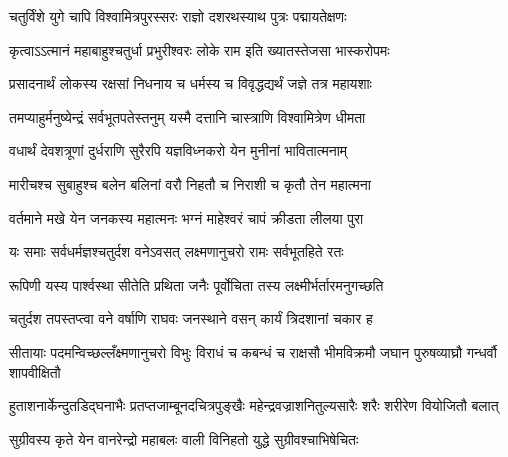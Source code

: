 

\storymeta



\addtocounter{shlokacount}{120}

\twolineshloka
{चतुर्विंशे युगे चापि विश्वामित्रपुरस्सरः}
{राज्ञो दशरथस्याथ पुत्रः पद्मायतेक्षणः}%

\twolineshloka
{कृत्वाऽऽत्मानं महाबाहुश्चतुर्धा प्रभुरीश्वरः}
{लोके राम इति ख्यातस्तेजसा भास्करोपमः}%

\twolineshloka
{प्रसादनार्थं लोकस्य रक्षसां निधनाय च}
{धर्मस्य च विवृद्धद्यर्थं जज्ञे तत्र महायशाः}%

\twolineshloka
{तमप्याहुर्मनुष्येन्द्रं सर्वभूतपतेस्तनुम्}
{यस्मै दत्तानि चास्त्राणि विश्वामित्रेण धीमता}%

\twolineshloka
{वधार्थं देवशत्रूणां दुर्धराणि सुरैरपि}
{यज्ञविध्नकरो येन मुनीनां भावितात्मनाम्}%

\twolineshloka
{मारीचश्च सुबाहुश्च बलेन बलिनां वरौ}
{निहतौ च निराशी च कृतौ तेन महात्मना}%

\twolineshloka
{वर्तमाने मखे येन जनकस्य महात्मनः} 
{भग्नं माहेश्वरं चापं क्रीडता लीलया पुरा} %

\twolineshloka
{यः समाः सर्वधर्मज्ञश्चतुर्दश वनेऽवसत्}
{लक्ष्मणानुचरो रामः सर्वभूतहिते रतः}%

\twolineshloka
{रूपिणी यस्य पार्श्वस्था सीतेति प्रथिता जनैः}
{पूर्वोचिता तस्य लक्ष्मीर्भर्तारमनुगच्छति}%

\twolineshloka
{चतुर्दश तपस्तप्त्वा वने वर्षाणि राघवः}
{जनस्थाने वसन् कार्यं त्रिदशानां चकार ह}%


\threelineshloka
{सीतायाः पदमन्विच्छल्लँक्ष्मणानुचरो विभुः}
{विराधं च कबन्धं च राक्षसौ भीमविक्रमौ}
{जघान पुरुषव्याघ्रौ गन्धर्वौ शापवीक्षितौ}%

\twolineshloka
{हुताशनार्केन्दुतडिद्घनाभैः प्रतप्तजाम्बूनदचित्रपुङ्खैः}
{महेन्द्रवज्राशनितुल्यसारैः शरैः शरीरेण वियोजितौ बलात्}%

\twolineshloka
{सुग्रीवस्य कृते येन वानरेन्द्रो महाबलः}
{वाली विनिहतो युद्धे सुग्रीवश्चाभिषेचितः}%

